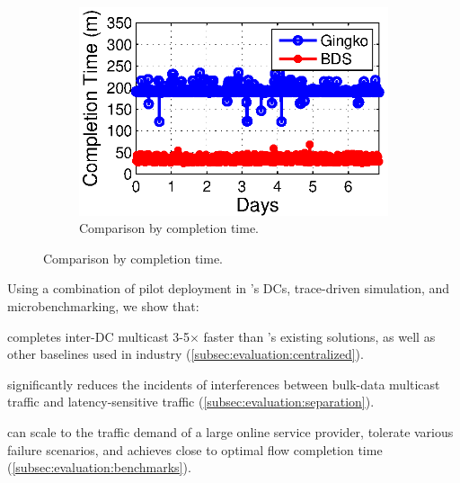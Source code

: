 \begin{figure}[t]
\begin{subfigure}[b]{0.3\textwidth}
                \label{fig:BDSvsAnon:FCT}
        \end{subfigure}
        \begin{subfigure}[b]{0.3\textwidth}
                \centering
                \includegraphics[width=\textwidth]{images/BDSvsAnon_time_v2.eps}
                \caption{Comparison by completion time.}
                \label{fig:BDSvsAnon:time}
        \end{subfigure}
        \label{fig:BDSvsAnon}
\vspace{-0.4cm}
\end{figure}

Using a combination of pilot deployment in \company's DCs,
trace-driven simulation, and microbenchmarking, we show that:
\begin{packedenumerate}
\item \name completes inter-DC multicast 3-5$\times$ faster than
\company's existing solutions, as well as other baselines used in
industry (\Section\ref{subsec:evaluation:centralized}).
\item \name significantly reduces the incidents of interferences
between bulk-data multicast traffic and latency-sensitive traffic
(\Section\ref{subsec:evaluation:separation}).
\item \name can scale to the traffic demand of a large online
service provider, tolerate various failure scenarios, and achieves
close to optimal flow completion time
(\Section\ref{subsec:evaluation:benchmarks}).
\end{packedenumerate}


